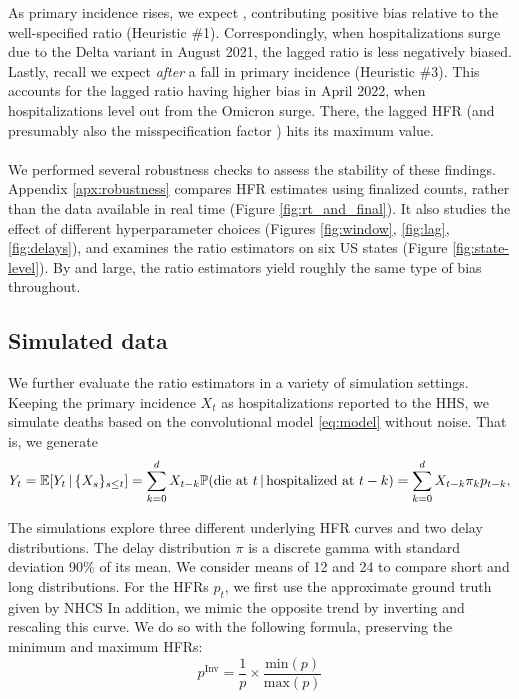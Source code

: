 \documentclass{article}
\newcommand{\given}{\, \vert \,}
\begin{document}
As primary incidence rises, we expect , contributing
positive bias relative to the well-specified
ratio (Heuristic \#1). Correspondingly, when hospitalizations surge due to the Delta variant in 
August 2021, the lagged ratio is less negatively biased. Lastly, recall we
expect  \emph{after} a fall in primary incidence (Heuristic \#3). This
accounts for the lagged ratio having higher bias in April 2022, when
hospitalizations level out from the Omicron surge. There, the lagged HFR (and 
presumably also the misspecification factor ) hits its maximum
value.   

\paragraph{}

We performed several robustness checks to assess the stability of these
findings. Appendix \ref{apx:robustness} compares HFR estimates using finalized counts, rather than the
data available in real time (Figure \ref{fig:rt_and_final}).
It also studies the effect of different
hyperparameter choices (Figures \ref{fig:window}, \ref{fig:lag}, \ref{fig:delays}), and examines the ratio estimators on six US
states (Figure \ref{fig:state-level}). By and large, the ratio estimators yield roughly
the same type of bias throughout.


\subsection{Simulated data}
\label{sec:results_sim}

We further evaluate the ratio estimators in a variety of simulation settings. 
Keeping the primary incidence $X_t$ as hospitalizations reported to the HHS, we simulate deaths based on the convolutional model \eqref{eq:model} without noise. That is, we generate
\[
Y_t = \E[Y_t\given \{X_s\}_{s\leq t}] = \sum_{k=0}^d X_{t-k} \P(\text{die at $t$} \given \text{hospitalized at
  $t-k$}) = \sum_{k=0}^d X_{t-k} \pi_k p_{t-k},
\]

The simulations explore three different underlying HFR curves and two delay distributions. The delay distribution $\pi$ is a discrete gamma with
standard deviation 90\% of its mean. We consider means of 12 and 24 to
compare short and long distributions.
For the HFRs $p_t$, we first use the approximate ground truth given by NHCS
In addition, we mimic the opposite trend by inverting and rescaling this curve. 
We do so with the following formula, preserving the minimum and maximum HFRs:
\[
p^\text{Inv} = \frac{1}{p}\times\frac{\text{min}(p)}{\text{max}(p)}
\]
\end{document}
